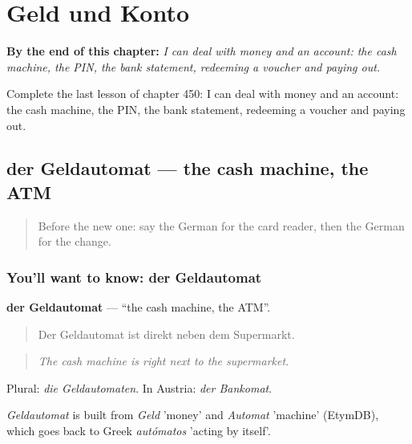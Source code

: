 
\chapter{Geld und Konto}
\label{ch:ge-geld-und-konto}

\begin{chapteropening}
\textbf{By the end of this chapter:} \emph{I can deal with money and an account: the cash machine, the PIN, the bank statement, redeeming a voucher and paying out.}

Complete the last lesson of chapter 450: I can deal with money and an account: the cash machine, the PIN, the bank statement, redeeming a voucher and paying out.
\end{chapteropening}

\section[der Geldautomat]{der Geldautomat — the cash machine, the ATM}

\label{lesson:GE-C450-geldautomat}



\begin{quote}
Before the new one: say the German for the card reader, then the German for the change.
\end{quote}

\subsection*{You'll want to know: der Geldautomat}
\textbf{der Geldautomat} — \textquotedblleft{}the cash machine, the ATM\textquotedblright{}.

\begin{quote}
Der Geldautomat ist direkt neben dem Supermarkt.
\end{quote}

\begin{quote}
\emph{The cash machine is right next to the supermarket.}
\end{quote}

Plural: \emph{die Geldautomaten}. In Austria: \emph{der Bankomat}.

\begin{cousinweb}
\emph{Geldautomat} is built from \emph{Geld} 'money' and \emph{Automat} 'machine' (EtymDB), which goes back to Greek \emph{autómatos} 'acting by itself'.
\end{cousinweb}

